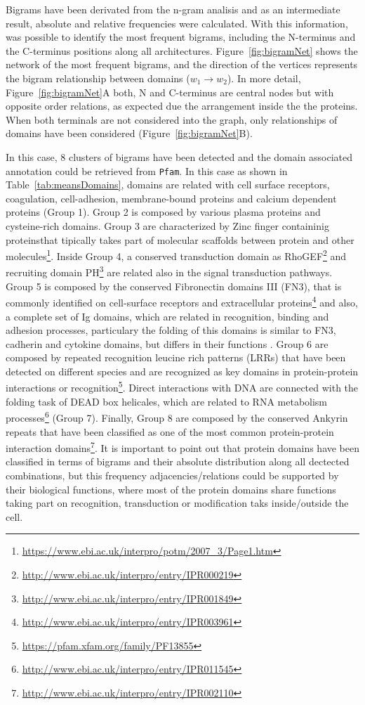 \documentclass[11pt]{article}
\begin{document}
Bigrams have been derivated from the n-gram analisis and as an intermediate
result, absolute and relative frequencies were calculated. With this
information, was possible to identify the most frequent bigrams, including the
N-terminus and the C-terminus positions along all architectures.
Figure~\ref{fig:bigramNet} shows the network of the most frequent bigrams, and
the direction of the vertices represents the bigram relationship between domains
($w_1 \rightarrow w_2$). In more detail, Figure~\ref{fig:bigramNet}A both, N and
C-terminus are central nodes but with opposite order relations, as expected due
the arrangement inside the the proteins. When both terminals are not considered into
the graph, only relationships of domains have been considered
(Figure~\ref{fig:bigramNet}B). 

In this case, $8$ clusters of bigrams have been detected and the domain
associated annotation could be retrieved from \texttt{Pfam}. In this case as
shown in Table~\ref{tab:meansDomains}, domains are related with cell surface
receptors, coagulation, cell-adhesion, membrane-bound proteins and calcium
dependent proteins (Group 1). Group 2 is composed by various plasma proteins and
cysteine-rich domains. Group 3 are characterized by Zinc finger containinig
proteinsthat tipically takes part of molecular scaffolds between protein and
other molecules\footnote{\url{https://www.ebi.ac.uk/interpro/potm/2007_3/Page1.htm}}.
Inside Group 4, a conserved transduction domain as
RhoGEF\footnote{\url{http://www.ebi.ac.uk/interpro/entry/IPR000219}} and
recruiting domain
PH\footnote{\url{http://www.ebi.ac.uk/interpro/entry/IPR001849}} are related
also in the signal transduction pathways. Group 5 is composed by the conserved
Fibronectin domains III (FN3), that is commonly identified on cell-surface
receptors and extracellular
proteins\footnote{\url{http://www.ebi.ac.uk/interpro/entry/IPR003961}} and also,
a complete set of Ig domains, which are related in recognition, binding and
adhesion processes, particulary the folding of this domains is similar to FN3,
cadherin and cytokine domains, but differs in their functions
\cite{Barclay:2003}. Group 6 are composed by repeated recognition leucine rich
patterns (LRRs) that have been detected on different species and are recognized
as key domains in protein-protein interactions or
recognition\footnote{\url{https://pfam.xfam.org/family/PF13855}}. Direct
interactions with DNA are connected with the folding task of DEAD box helicales,
which are related to RNA metabolism
processes\footnote{\url{http://www.ebi.ac.uk/interpro/entry/IPR011545}} (Group
7). Finally, Group 8 are composed by the conserved Ankyrin repeats that have
been classified as one of the most common protein-protein interaction
domains\footnote{\url{http://www.ebi.ac.uk/interpro/entry/IPR002110}}. It is
important to point out that protein domains have been classified in terms of
bigrams and their absolute distribution along all dectected combinations, but
this frequency adjacencies/relations could be supported by their biological
functions, where most of the protein domains share functions taking part on
recognition, transduction or modification taks inside/outside the cell.
\end{document}
